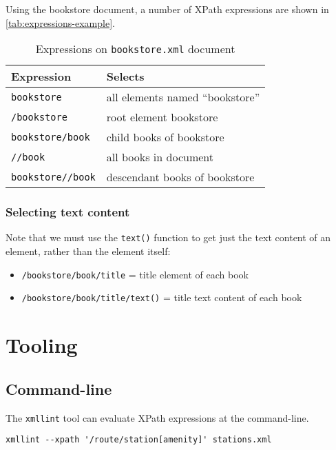 \documentclass[slides]{pgnotes}
\begin{document}
Using the bookstore document, a number of XPath expressions are shown in \autoref{tab:expressions-example}. 

\begin{table}[htbp]
  \centering
  \begin{tabular}{l l}
    \toprule
    \textbf{Expression} & \textbf{Selects} \\
    \midrule
    \texttt{bookstore} & all elements named ``bookstore'' \\
    \texttt{/bookstore} & root element bookstore \\
    \texttt{bookstore/book} & child books of bookstore \\
    \texttt{//book} & all books in document \\
    \texttt{bookstore//book} & descendant books of bookstore\\
    \bottomrule
  \end{tabular}
  \caption{Expressions on \texttt{bookstore.xml} document}
  \label{tab:expressions-example}
\end{table}


\subsubsection{Selecting text content}

Note that we must use the \texttt{text()} function to get just the text content of an element, rather than the element itself:
\begin{itemize}
\item \texttt{/bookstore/book/title} = title element of each book
\item \texttt{/bookstore/book/title/text()} = title text content of each book
\end{itemize}

\section{Tooling}

\subsection{Command-line}

The \texttt{xmllint} tool can evaluate XPath expressions at the command-line.

\begin{verbatim}
xmllint --xpath '/route/station[amenity]' stations.xml
\end{verbatim}
\end{document}
